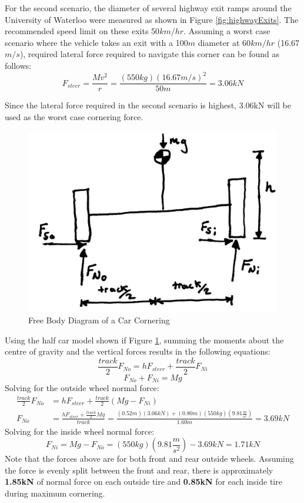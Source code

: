 \documentclass[12pt]{article}
\begin{document}
For the second scenario, the diameter of several highway exit ramps around the University of Waterloo were measured as shown in Figure \ref{fig:highwayExits}. The recommended speed limit on these exits 50$km/hr$. Assuming a worst case scenario where the vehicle takes an exit with a 100$m$ diameter at 60$km/hr$ (16.67$m/s$), required lateral force required to navigate this corner can be found as follows: 
\begin{equation}
	F_{steer} = \frac{Mv^2}{r} = \frac{(550kg)(16.67m/s)^2}{50m} = 3.06kN
\end{equation}

Since the lateral force required in the second scenario is highest, 3.06kN will be used as the worst case cornering force. 

\begin{figure}[h!]
	\centering
	\includegraphics[width=.5\textwidth]{./LaTex/steerFBD.jpg}
	\caption{Free Body Diagram of a Car Cornering}
	\label{fig:steerFBD}
\end{figure}

Using the half car model shown if Figure \ref{fig:steerFBD}, summing the moments about the centre of gravity and the vertical forces results in the following equations: 
\begin{equation}
	\frac{track}{2}F_{No} = hF_{steer} + \frac{track}{2}F_{Ni}
\end{equation}
\begin{equation}
	F_{No} + F_{Ni} = Mg
\end{equation}
Solving for the outside wheel normal force: 
\begin{equation}
\begin{split}
	\frac{track}{2}F_{No} &= hF_{steer} + \frac{track}{2}(Mg - F_{Ni})\\
	F_{No} &= \frac{hF_{steer} + \frac{track}{2}Mg}{track} = \frac{(0.52m)(3.06kN)+(0.80m)(550kg)\left(9.81\frac{m}{s^2}\right)}{1.60m} = 3.69kN
\end{split}
\end{equation}
Solving for the inside wheel normal force: 
\begin{equation}
	F_{Ni} = Mg - F_{No} = (550kg)\left(9.81\frac{m}{s^2}\right) - 3.69kN = 1.71kN
\end{equation}
Note that the forces above are for both front and rear outside wheels. Assuming the force is evenly split between the front and rear, there is approximately \textbf{1.85kN} of normal force on each outside tire and \textbf{0.85kN} for each inside tire during maximum cornering.
 
\end{document}
